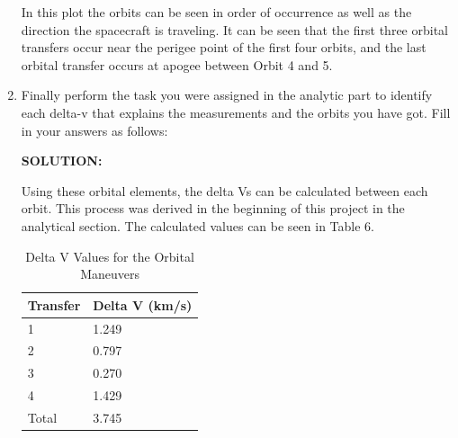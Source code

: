 \documentclass[12pt, letterpaper]{aiaa-tc}
\begin{document}
\begin{enumerate}
    In this plot the orbits can be seen in order of occurrence as well as the direction the spacecraft is traveling. 
    It can be seen that the first three orbital transfers occur near the perigee point of the first four orbits, and the last orbital 
    transfer occurs at apogee between Orbit 4 and 5.

    \newpage
    \item Finally perform the task you were assigned in the analytic part to identify each delta-v that explains the
    measurements and the orbits you have got. Fill in your answers as follows:
    
    \textbf{SOLUTION:}

    Using these orbital elements, the delta Vs can be calculated between each orbit. This process was derived in the 
    beginning of this project in the analytical section. The calculated values can be seen in Table 6.

    \begin{table}[]
        \centering
        \begin{tabular}{|l|l|}
        \hline
        Transfer & Delta V (km/s) \\ \hline
        1        & 1.249          \\ \hline
        2        & 0.797          \\ \hline
        3        & 0.270          \\ \hline
        4        & 1.429          \\ \hline
        Total    & 3.745          \\ \hline
        \end{tabular}
        \caption{Delta V Values for the Orbital Maneuvers}
    \end{table}
\end{enumerate}
\end{document}
